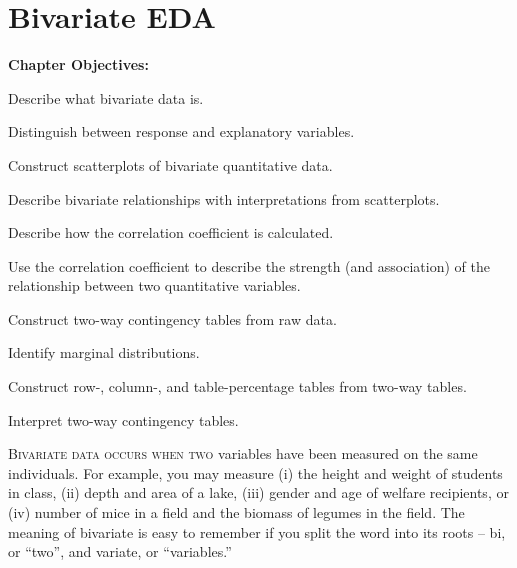 \documentclass[10pt,openany]{book}\usepackage[]{graphicx}\usepackage[]{color}
\begin{document}
\chapter{Bivariate EDA} \label{chap:BivEDA}
\begin{ChapObj}{\boxwidth}
  \textbf{Chapter Objectives:}
  \begin{Enumerate}
    \item Describe what bivariate data is.
    \item Distinguish between response and explanatory variables.
    \item Construct scatterplots of bivariate quantitative data.
    \item Describe bivariate relationships with interpretations from scatterplots.
    \item Describe how the correlation coefficient is calculated.
    \item Use the correlation coefficient to describe the strength (and association) of the relationship between two quantitative variables.
    \item Construct two-way contingency tables from raw data.
    \item Identify marginal distributions.
    \item Construct row-, column-, and table-percentage tables from two-way tables.
    \item Interpret two-way contingency tables.
  \end{Enumerate}
\end{ChapObj}

\minitoc
\newpage

\lettrine{B}{ivariate data occurs when two} variables have been measured on the same individuals.  For example, you may measure (i) the height and weight of students in class, (ii) depth and area of a lake, (iii) gender and age of welfare recipients, or (iv) number of mice in a field and the biomass of legumes in the field.  The meaning of bivariate is easy to remember if you split the word into its roots -- bi, or ``two'', and variate, or ``variables.''

\end{document}
